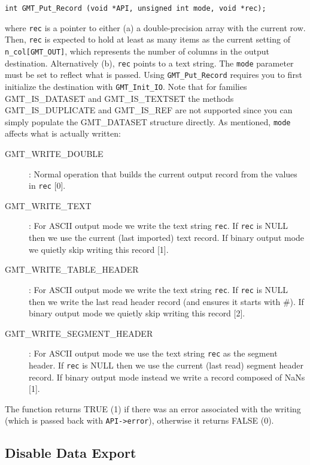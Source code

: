 \documentclass[11pt]{report}
\begin{document}
\begin{verbatim}
int GMT_Put_Record (void *API, unsigned int mode, void *rec);
\end{verbatim}
where \texttt{rec} is a pointer to either (a) a double-precision array with the current row.
Then, \texttt{rec} is expected to hold at least as many items as the current setting of
\texttt{n\_col[GMT\_OUT]}, which represents the number of columns in the output destination.
Alternatively (b), \texttt{rec} points to a text string.
The \texttt{mode} parameter must be set to reflect what is passed.  Using \texttt{GMT\_Put\_Record}
requires you to first initialize the destination with \texttt{GMT\_Init\_IO}.
Note that for families GMT\_IS\_DATASET and GMT\_IS\_TEXTSET the methods GMT\_IS\_DUPLICATE and GMT\_IS\_REF are not supported since
you can simply populate the GMT\_DATASET structure directly.
As mentioned, \texttt{mode} affects what is actually written:
\begin{description}
\item [GMT\_WRITE\_DOUBLE]: Normal operation that builds the current output record from
the values in \texttt{rec} [0].
\item [GMT\_WRITE\_TEXT]: For ASCII output mode we write the text string \texttt{rec}.
If \texttt{rec} is NULL then we use the current (last imported) text record.
If binary output mode we quietly skip writing this record [1].
\item [GMT\_WRITE\_TABLE\_HEADER]: For ASCII output mode we write the text string \texttt{rec}.
If \texttt{rec} is NULL then we write the last read
header record (and ensures it starts with \#). If binary output mode we quietly skip writing this record [2].
\item [GMT\_WRITE\_SEGMENT\_HEADER]: For ASCII output mode we use the text string \texttt{rec} as the segment header.
If \texttt{rec} is NULL then we use the current (last read) segment header record.
If binary output mode instead we write a record composed of NaNs [1].
\end{description}
The function returns TRUE (1) if there was an error associated with the writing (which is passed back with \texttt{API->error}),
otherwise it returns FALSE (0).

\subsection{Disable Data Export}
\end{document}
